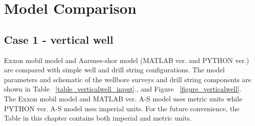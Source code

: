 %

\section{Model Comparison}

\subsection{Case 1 - vertical well}

Exxon mobil model and Aarsnes-shor model (MATLAB ver. and PYTHON ver.) are compared with simple well and drill string configurations. The model parameters and schematic of the wellbore surveys and drill string components are shown in Table \tablename~\ref{table_verticalwell_input}., and Figure \figurename~\ref{figure_verticalwell}. The Exxon mobil model and MATLAB ver. A-S model uses metric units while PYTHON ver. A-S model uses imperial units. For the future convenience, the Table in this chapter contains both imperial and metric units.


